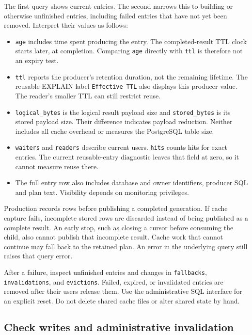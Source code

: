 The first query shows current entries. The second narrows this to building
or otherwise unfinished entries, including failed entries that have not yet
been removed. Interpret their values as follows:
\begin{itemize}
  \item \texttt{age} includes time spent producing the entry. The
    completed-result TTL clock starts later, at completion. Comparing
    \texttt{age} directly with \texttt{ttl} is therefore not an expiry test.
  \item \texttt{ttl} reports the producer's retention duration, not the
    remaining lifetime. The reusable EXPLAIN label \texttt{Effective TTL}
    also displays this producer value. The reader's smaller TTL can still
    restrict reuse.
  \item \texttt{logical\_bytes} is the logical result payload size and
    \texttt{stored\_bytes} is its stored payload size. Their difference
    indicates payload reduction. Neither includes all cache overhead or
    measures the PostgreSQL table size.
  \item \texttt{waiters} and \texttt{readers} describe current users.
    \texttt{hits} counts hits for exact entries. The current reusable-entry
    diagnostic leaves that field at zero, so it cannot measure reuse there.
  \item The full entry row also includes database and owner identifiers,
    producer SQL and plan text. Visibility depends on monitoring privileges.
\end{itemize}

Production records rows before publishing a completed generation. If cache
capture fails, incomplete stored rows are discarded instead of being published
as a complete result. An early stop, such as closing a cursor before consuming
the child, also cannot publish that incomplete result. Cache work that cannot
continue may fall back to the retained plan. An error in the underlying query
still raises that query error.

After a failure, inspect unfinished entries and changes in
\texttt{fallbacks}, \texttt{invalidations}, and \texttt{evictions}.
Failed, expired, or invalidated entries are removed after their users release
them. Use the administrative SQL interface for an explicit reset. Do not
delete shared cache files or alter shared state by hand.

\subsection{Check writes and administrative invalidation}

